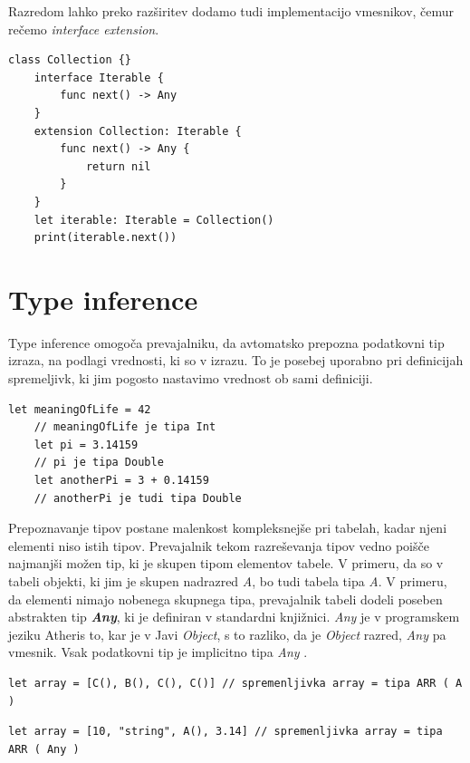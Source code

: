 \documentclass[a4paper, 12pt]{book}
\begin{document}
Razredom lahko preko razširitev dodamo tudi implementacijo vmesnikov, čemur rečemo \textit{interface extension}.

\begin{lstlisting}[caption=Razširitev z vmesnikom, captionpos=b]
	class Collection {}
	interface Iterable {
	    func next() -> Any
	}
	extension Collection: Iterable {
	    func next() -> Any {
	        return nil
	    }
	}
	let iterable: Iterable = Collection()
	print(iterable.next())
\end{lstlisting}

\section{Type inference}

Type inference omogoča prevajalniku, da avtomatsko prepozna podatkovni tip izraza, na podlagi vrednosti, ki so v izrazu. To je posebej uporabno pri definicijah spremeljivk, ki jim pogosto nastavimo vrednost ob sami definiciji.

\begin{lstlisting}[caption={Type inference}, captionpos=b]
	let meaningOfLife = 42
	// meaningOfLife je tipa Int
	let pi = 3.14159
	// pi je tipa Double
	let anotherPi = 3 + 0.14159
	// anotherPi je tudi tipa Double
\end{lstlisting}

Prepoznavanje tipov postane malenkost kompleksnejše pri tabelah, kadar njeni elementi niso istih tipov. Prevajalnik tekom razreševanja tipov vedno poišče najmanjši možen tip, ki je skupen tipom elementov tabele. V primeru, da so v tabeli objekti, ki jim je skupen nadrazred \textit{A}, bo tudi tabela tipa \textit{A}. V primeru, da elementi nimajo nobenega skupnega tipa, prevajalnik tabeli dodeli poseben abstrakten tip \textit{\textbf{Any}}, ki je definiran v standardni knjižnici. \textit{Any} je v programskem jeziku Atheris to, kar je v Javi \textit{Object}, s to razliko, da je \textit{Object} razred, \textit{Any} pa vmesnik. Vsak podatkovni tip je implicitno tipa \textit{Any} .

\begin{lstlisting}[caption={Elementi tabele s skupnim nadrazredom}, captionpos=b]
	let array = [C(), B(), C(), C()] // spremenljivka array = tipa ARR ( A )
\end{lstlisting}

\begin{lstlisting}[caption={Elementi tabele nimajo skupnega tipa}, captionpos=b]
	let array = [10, "string", A(), 3.14] // spremenljivka array = tipa ARR ( Any )
\end{lstlisting}
\end{document}

